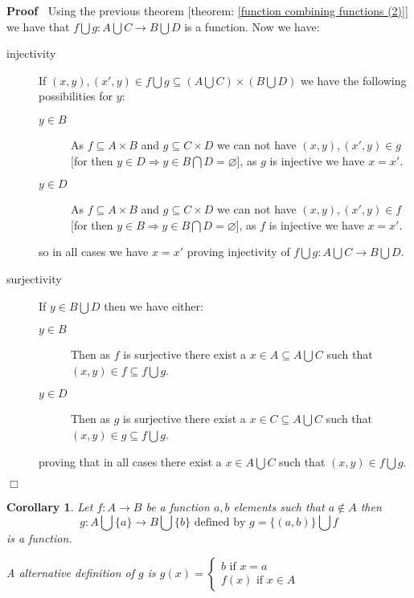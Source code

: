 \documentclass{book}
\newcommand{\nin}{\not\in}
\newenvironment{proof}{\noindent\textbf{Proof\ }}{\hspace*{\fill}$\Box$\medskip}
\newtheorem{corollary}{Corollary}
\begin{document}
\begin{proof}
  Using the previous theorem [theorem: \ref{function combining functions (2)}]
  we have that $f \bigcup g : A \bigcup C \rightarrow B \bigcup D$ is a
  function. Now we have:
  \begin{description}
    \item[injectivity] If $(x, y), (x', y) \in f \bigcup g \subseteq \left( A
    \bigcup C \right) \times \left( B \bigcup D \right)$ we have the following
    possibilities for $y$:
    \begin{description}
      \item[$y \in B$] As $f \subseteq A \times B$ and $g \subseteq C \times
      D$ we can not have $(x, y), (x', y) \in g$ [for then $y \in D
      \Rightarrow y \in B \bigcap D = \varnothing$], as $g$ is injective we
      have $x = x'$.
      
      \item[$y \in D$] As $f \subseteq A \times B$ and $g \subseteq C \times
      D$ we can not have $(x, y), (x', y) \in f$ [for then $y \in B
      \Rightarrow y \in B \bigcap D = \varnothing$], as $f$ is injective we
      have $x = x'$.
    \end{description}
    so in all cases we have $x = x'$ proving injectivity of $f \bigcup g : A
    \bigcup C \rightarrow B \bigcup D$.
    
    \item[surjectivity] If $y \in B \bigcup D$ then we have either:
    \begin{description}
      \item[$y \in B$] Then as $f$ is surjective there exist a $x \in A
      \subseteq A \bigcup C$ such that $(x, y) \in f \subseteq f \bigcup g$.
      
      \item[$y \in D$] Then as $g$ is surjective there exist a $x \in C
      \subseteq A \bigcup C$ such that $(x, y) \in g \subseteq f \bigcup g$.
    \end{description}
    proving that in all cases there exist a $x \in A \bigcup C$ such that $(x,
    y) \in f \bigcup g$.
  \end{description}
\end{proof}

\begin{corollary}
  \label{function extending funtion domain}Let $f : A \rightarrow B$ be a
  function $a, b$ elements such that $a \nin A$ then
  \[ g : A \bigcup \{ a \} \rightarrow B \bigcup \{ b \} \text{ defined by } g
     = \{ (a, b) \} \bigcup f \]
  is a function.
  
  \begin{note}
    A alternative definition of $g$ is $g (x) = \left\{\begin{array}{l}
      b \text{ if } x = a\\
      f (x) \text{ if } x \in A
    \end{array}\right.$
  \end{note}
\end{corollary}
\end{document}

